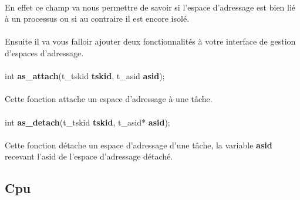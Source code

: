 \documentclass[10pt,a4wide]{article}
\begin{document}
\paragraph{}

En effet ce champ va nous permettre de savoir si l'espace d'adressage
est bien li\'e \`a un processus ou si au contraire il est encore
isol\'e.

\paragraph{}

Ensuite il va vous falloir ajouter deux fonctionnalit\'es \`a votre
interface de gestion d'espaces d'adressage.

\paragraph{}

\hspace{1.5cm}int \textbf{as\_attach}(t\_tskid \textbf{tskid},
                                      t\_asid \textbf{asid});

\paragraph{}

Cette fonction attache un espace d'adressage \`a une t\^ache.

\paragraph{}

\hspace{1.5cm}int \textbf{as\_detach}(t\_tskid \textbf{tskid},
                                      t\_asid* \textbf{asid});

\paragraph{}

Cette fonction d\'etache un espace d'adressage d'une t\^ache, la variable
\textbf{asid} recevant l'asid de l'espace d'adressage d\'etach\'e.

\subsection{Cpu}

\paragraph{}
\end{document}

